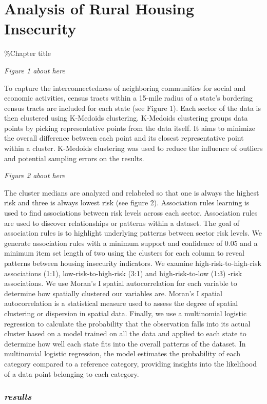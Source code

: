\chapter{Analysis of Rural Housing Insecurity}	\%Chapter title

\textit{Figure 1 about here}

To capture the interconnectedness of neighboring communities for social and economic activities, census tracts within a 15-mile radius of a state’s bordering census tracts are included for each state (see Figure 1). Each sector of the data is then clustered using K-Medoids clustering. K-Medoids clustering groups data points by picking representative points from the data itself. It aims to minimize the overall difference between each point and its closest representative point within a cluster.  K-Medoids clustering was used to reduce the influence of outliers and potential sampling errors on the results.  


\textit{Figure 2 about here}

The cluster medians are analyzed and relabeled so that one is always the highest risk and three is always lowest risk (see figure 2). Association rules learning is used to find associations between risk levels across each sector. Association rules are used to discover relationships or patterns within a dataset. The goal of association rules is to highlight underlying patterns between sector risk levels. We generate association rules with a minimum support and confidence of 0.05 and a minimum item set length of two using the clusters for each column to reveal patterns between housing insecurity indicators. We examine high-risk-to-high-risk associations (1:1), low-risk-to-high-risk (3:1) and high-risk-to-low (1:3) -risk associations. We use Moran’s I spatial autocorrelation for each variable to determine how spatially clustered our variables are. Moran's I spatial autocorrelation is a statistical measure used to assess the degree of spatial clustering or dispersion in spatial data. Finally, we use a multinomial logistic regression to calculate the probability that the observation falls into its actual cluster based on a model trained on all the data and applied to each state to determine how well each state fits into the overall patterns of the dataset. In multinomial logistic regression, the model estimates the probability of each category compared to a reference category, providing insights into the likelihood of a data point belonging to each category. 

\subsection{\textit{results}}

